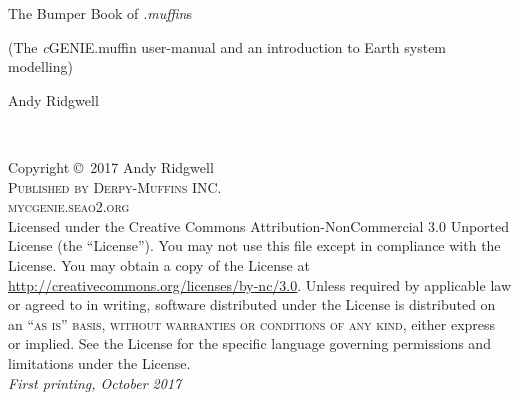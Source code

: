 \documentclass[11pt,fleqn]{book} %
\begin{document}

\begingroup
\thispagestyle{empty}
\centering
\vspace*{7.5 cm}
\par\normalfont\fontsize{30}{30}\sffamily\selectfont
\textcolor[rgb]{1,1,0}{The Bumper Book of \textit{.muffin}s}\par %
\vspace*{0.5cm}
\par\normalfont\fontsize{21}{21}\sffamily\selectfont
\textcolor[rgb]{0,0,1}{(The \textit{c}GENIE.muffin user-manual and an introduction to Earth system modelling)}\par %
\vspace*{1cm}
{\Huge \textcolor[rgb]{1,1,1}{Andy Ridgwell}}\par %
\endgroup


\newpage
~\vfill
\thispagestyle{empty}

\noindent Copyright \copyright\ 2017 Andy Ridgwell\\ %

\noindent \textsc{Published by Derpy-Muffins INC.}\\ %

\noindent \textsc{mycgenie.seao2.org}\\ %

\noindent Licensed under the Creative Commons Attribution-NonCommercial 3.0 Unported License (the ``License''). You may not use this file except in compliance with the License. You may obtain a copy of the License at \url{http://creativecommons.org/licenses/by-nc/3.0}. Unless required by applicable law or agreed to in writing, software distributed under the License is distributed on an \textsc{``as is'' basis, without warranties or conditions of any kind}, either express or implied. See the License for the specific language governing permissions and limitations under the License.\\ %

\noindent \textit{First printing, October 2017} %
\end{document}
